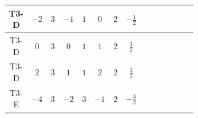 \documentclass[8pt]{article}
\begin{document}
\begin{landscape}
\begin{longtable}{@{}cccccccc >{\raggedright\arraybackslash}p{0.21\linewidth} >{\raggedright\arraybackslash}p{0.21\linewidth} >{\raggedright\arraybackslash}p{0.21\linewidth}@{}}
T3-D & $-2$ & $3$ & $-1$ & $1$ & $0$ & $2$ & $-\frac{1}{2}$ & \scriptsize\adjustbox{max width=\linewidth}{$\begin{gathered} +D_{\mu _1}\left(S_2\right){}^{\dagger } D_{\mu _1}\left(S_2\right)\end{gathered}$} & \scriptsize\adjustbox{max width=\linewidth}{$\begin{gathered} -\overline{F_{j_1,r_1}}\, F_{j_1,r_1} M_F\end{gathered}$} & \scriptsize\adjustbox{max width=\linewidth}{$\begin{gathered} +i \overline{F_{j_1,r_1}}\, \gamma ^{\mu _1}\, D_{\mu _1}\left(F_{j_1,r_1}\right)\end{gathered}$} \\
\midrule
T3-D & $0$ & $3$ & $0$ & $1$ & $1$ & $2$ & $\frac{1}{2}$ & \scriptsize\adjustbox{max width=\linewidth}{$\begin{gathered} +D_{\mu _1}\left(S_2\right){}^{\dagger } D_{\mu _1}\left(S_2\right)\end{gathered}$} & \scriptsize\adjustbox{max width=\linewidth}{$\begin{gathered} -\overline{F_{j_1,r_1}}\, F_{j_1,r_1} M_F\end{gathered}$} & \scriptsize\adjustbox{max width=\linewidth}{$\begin{gathered} +i \overline{F_{j_1,r_1}}\, \gamma ^{\mu _1}\, D_{\mu _1}\left(F_{j_1,r_1}\right)\end{gathered}$} \\
\midrule
T3-D & $2$ & $3$ & $1$ & $1$ & $2$ & $2$ & $\frac{3}{2}$ & \scriptsize\adjustbox{max width=\linewidth}{$\begin{gathered} +D_{\mu _1}\left(S_2\right){}^{\dagger } D_{\mu _1}\left(S_2\right)\end{gathered}$} & \scriptsize\adjustbox{max width=\linewidth}{$\begin{gathered} -\overline{F_{j_1,r_1}}\, F_{j_1,r_1} M_F\end{gathered}$} & \scriptsize\adjustbox{max width=\linewidth}{$\begin{gathered} +i \overline{F_{j_1,r_1}}\, \gamma ^{\mu _1}\, D_{\mu _1}\left(F_{j_1,r_1}\right)\end{gathered}$} \\
\midrule
T3-E & $-4$ & $3$ & $-2$ & $3$ & $-1$ & $2$ & $-\frac{3}{2}$ & \scriptsize\adjustbox{max width=\linewidth}{$\begin{gathered} +D_{\mu _1}\left(S_{2,j_1}\right){}^{\dagger } D_{\mu _1}\left(S_{2,j_1}\right)\end{gathered}$} & \scriptsize\adjustbox{max width=\linewidth}{$\begin{gathered} -\overline{F_{j_1,r_1}}\, F_{j_1,r_1} M_F\end{gathered}$} & \scriptsize\adjustbox{max width=\linewidth}{$\begin{gathered} +i \overline{F_{j_1,r_1}}\, \gamma ^{\mu _1}\, D_{\mu _1}\left(F_{j_1,r_1}\right)\end{gathered}$} \\

\end{longtable}
\end{landscape}
\end{document}
